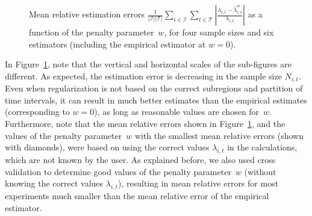 \documentclass[article]{jss}
\begin{document}
\begin{figure}
\centering
\resizebox{\textwidth}{!}{
\begin{tabular}{cc}
\texttt{[image: 2weeks\_Color\_Unknown\_v3.pdf]} &
\texttt{[image: 20weeks\_Color\_Unknown\_v3.pdf]} \\
$\hspace*{0.6cm}$ $N_{i,t} = 14$ periods observed & $\hspace*{0.6cm}$ $N_{i,t} = 140$ periods observed
\vspace{5mm} \\
\texttt{[image: 100weeks\_Color\_Unknown\_v3.pdf]} &
\texttt{[image: 1000weeks\_Color\_Unknown\_v3.pdf]}\\ 
$\hspace*{0.6cm}$ $N_{i,t} = 700$ periods observed \vspace{5mm} &
$\hspace*{0.6cm}$ $N_{i,t} = 7000$ periods observed \vspace{5mm}
\end{tabular}}
\caption{\label{figureserr1}
Mean relative estimation errors $\frac{1}{|\mathcal{I}||\mathcal{T}|} \sum_{i \in \mathcal{I}} \sum_{t \in \mathcal{T}} \left|\frac{\lambda_{i,t} - \hat{\lambda}^{w}_{i,t}}{\lambda_{i,t}}\right|$ as a function of the penalty parameter~$w$, for four sample sizes and six estimators (including the empirical estimator at $w = 0$).
}
\end{figure}



In Figure~\ref{figureserr1}, note that the vertical and horizontal scales of the sub-figures are different.
As expected, the estimation error is decreasing in the sample size $N_{i,t}$.
Even when regularization is not based on the correct subregions and partition of time intervals, it can result in much better estimates than the empirical estimates (corresponding to $w = 0$), as long as reasonable values are chosen for~$w$.
Furthermore, note that the mean relative errors shown in Figure~\ref{figureserr1}, and the values of the penalty parameter~$w$ with the smallest mean relative errors (shown with diamonds), were based on using the correct values $\lambda_{i,t}$ in the calculations, which are not known by the user.
As explained before, we also used cross validation to determine good values of the penalty parameter~$w$ (without knowing the correct values $\lambda_{i,t}$), resulting in mean relative errors for most experiments much smaller than the mean relative error of the empirical estimator.
\end{document}
